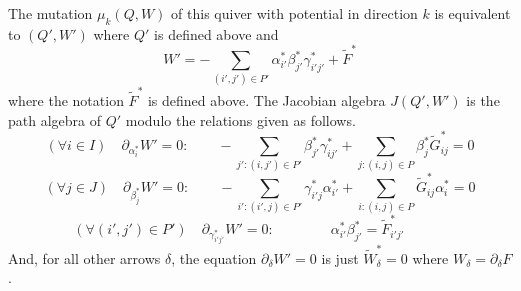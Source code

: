 \documentclass[ALCO,ThmDefs,Unicode,epreuves]{cedram}
\begin{document}
\begin{prop}\label{prop: formula for mutation of W}  
The mutation $\mu_k(Q,W)$ of this quiver with potential in direction $k$ is equivalent to $(Q',W')$ where $Q'$ is defined above and
\[
	W'=-\sum_{(i',j')\in P'} \alpha_{i'}^\ast\beta_{j'}^\ast\gamma_{i'j'}^\ast+\widetilde F^\ast
\]
where the notation $\widetilde F^\ast$ is defined above. The Jacobian algebra $J(Q',W')$ is the path algebra of $Q'$ modulo the relations given as follows.
\[
	(\forall i\in I)\quad \partial_{\alpha_i^\ast}W'=0:\qquad -\sum_{j':(i,j')\in P'} \beta_{j'}^\ast\gamma_{ij'}^\ast +
	\sum_{j:(i,j)\in P}\beta_{j}^\ast \widetilde G_{ij}^\ast=0
\]
\[
	(\forall j\in J)\quad \partial_{\beta_j^\ast}W'=0:\qquad -\sum_{i': (i',j)\in P'} \gamma_{i'j}^\ast\alpha_{i'}^\ast+\sum_{i:(i,j)\in P} \widetilde G_{ij}^\ast\alpha_{i}^\ast =0
\]
\[
	(\forall (i',j')\in P')\quad \partial_{\gamma_{i'j'}^\ast}W'=0:\qquad\qquad \alpha_{i'}^\ast\beta_{j'}^\ast=\widetilde F_{i'j'}^\ast\qquad\quad 
\]
And, for all other arrows $\delta$, the equation $\partial_\delta W'=0$ is just $\widetilde W_\delta^\ast=0$ where $W_\delta=\partial_\delta  F$.
\end{prop}
\end{document}
